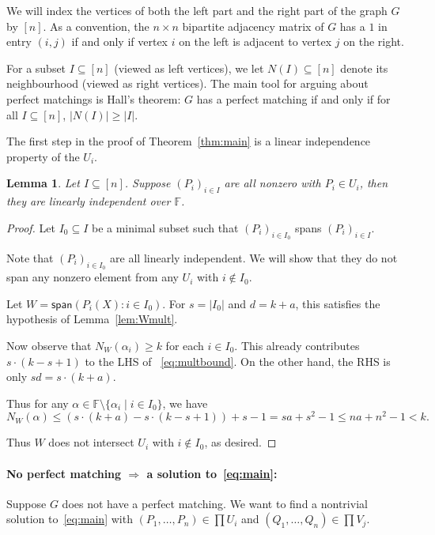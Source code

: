 \documentclass{article}
\newtheorem{lemma}[theorem]{Lemma}
\newcommand{\F}{\mathbb{F}}
\begin{document}
We will index the vertices of both the left part and the right part of the graph $G$ by $[n]$. 
As a convention, the $n \times n$ bipartite adjacency matrix of $G$ has a $1$ in entry $(i,j)$
if and only if vertex $i$ on the left is adjacent to vertex $j$ on the right.

For a subset $I \subseteq [n]$ (viewed as left vertices),
we let $N(I) \subseteq [n]$ denote its neighbourhood (viewed as right vertices). The main tool for arguing about perfect matchings is Hall's theorem: $G$ has a perfect matching if and only if for all $I \subseteq [n]$, $|N(I)| \geq |I|$.


The first step in the proof of Theorem~\ref{thm:main} is a linear independence property of the $U_i$.

\begin{lemma}\label{lem:lin-indep}
 Let $I \subseteq [n]$.
 Suppose $(P_i )_{i \in I}$ are all nonzero with $P_i \in U_i$, then they are linearly independent over $\F$.
\end{lemma}
\begin{proof}
Let $I_0 \subseteq I$ be a minimal 
subset such that $(P_i)_{i \in I_0}$ spans
$(P_i)_{i \in I}$. 

Note that $(P_i)_{i \in I_0}$ are all linearly independent.
We will show that they do not span any nonzero element
from any $U_i$ with $i \not\in I_0$.

Let $W = \mathsf{span}( P_i(X) : i \in I_0 )$.
For $s = |I_0|$ and $d = k + a$, this satisfies the hypothesis of Lemma~\ref{lem:Wmult}.

Now observe that $N_W(\alpha_i) \geq k$ for each $i \in I_0$.
This already contributes $s \cdot (k - s + 1)$ to the LHS of 
~\eqref{eq:multbound}.
On the other hand, the RHS is only $sd = s \cdot (k + a)$.

Thus for any $\alpha \in \F \setminus \{ \alpha_i \mid i \in I_0 \}$, we have
$$N_W(\alpha) \leq  \left( s \cdot (k+a) - s \cdot (k-s+1) \right) + s - 1 = sa + s^2 - 1 \leq na  + n^2 -1 < k.$$

Thus $W$ does not intersect $U_i$ with $i \not\in I_0$, as desired.
\end{proof}




\paragraph{No perfect matching $\Rightarrow$ a solution to~\eqref{eq:main}:}

Suppose $G$ does not have a perfect matching.
We want to find a nontrivial solution to~\eqref{eq:main} with
$(P_1, \ldots, P_n) \in \prod U_i$ and $(Q_1, \ldots, Q_n) \in \prod V_j$.
\end{document}
